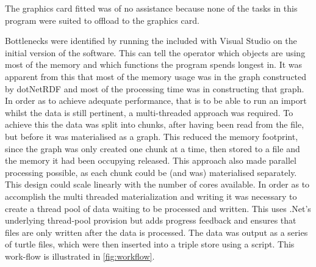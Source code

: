 The graphics card fitted was of no assistance because none of the tasks in this program were suited to offload to the graphics card.

Bottlenecks were identified by running the  included with Visual Studio on the initial version of the software. This can tell the operator which objects are using most of the memory and which functions the program spends longest in. It was apparent from this that most of the memory usage was in the graph constructed by dotNetRDF and most of the processing time was in constructing that graph. In order as to achieve adequate performance, that is to be able to run an import whilst the data is still pertinent, a multi-threaded approach was required. To achieve this the data was split into chunks, after having been read from the file, but before it was materialised as a graph. This reduced the memory footprint, since the graph was only created one chunk at a time, then stored to a file and the memory it had been occupying released. This approach also made parallel processing possible, as each chunk could be (and was) materialised separately. This design could scale linearly with the number of cores available. In order as to accomplish the multi threaded materialization and writing it was necessary to create a thread pool of data waiting to be processed and written. This uses .Net's underlying thread-pool provision but adds progress feedback and ensures that files are only written after the data is processed. The data was output as a series of turtle files, which were then inserted into a triple store using a script. This work-flow is illustrated in \autoref{fig:workflow}.

